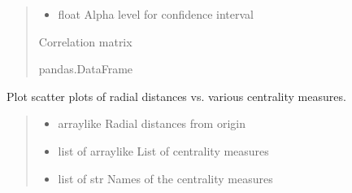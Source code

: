 \documentclass[letterpaper,10pt,english]{sphinxmanual}
\begin{document}
\begin{fulllineitems}
\begin{quote}
\begin{description}
\begin{itemize}
\item {} 
\sphinxAtStartPar
{} \textendash{} float
Alpha level for confidence interval

\end{itemize}

\sphinxAtStartPar
Correlation matrix

\sphinxAtStartPar
pandas.DataFrame

\end{description}\end{quote}

\end{fulllineitems}


\begin{fulllineitems}
\label{\detokenize{graphem:graphem.visualization.plot_radial_vs_centrality}}
\pysigstartsignatures
{}
\pysigstopsignatures
\sphinxAtStartPar
Plot scatter plots of radial distances vs. various centrality measures.
\begin{quote}\begin{description}
\begin{itemize}
\item {} 
\sphinxAtStartPar
{} \textendash{} array\sphinxhyphen{}like
Radial distances from origin

\item {} 
\sphinxAtStartPar
{} \textendash{} list of array\sphinxhyphen{}like
List of centrality measures

\item {} 
\sphinxAtStartPar
{} \textendash{} list of str
Names of the centrality measures

\end{itemize}

\end{description}\end{quote}

\end{fulllineitems}
\end{document}

